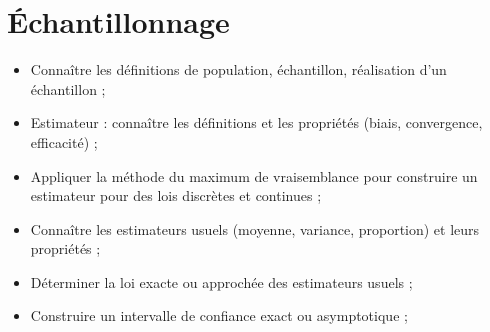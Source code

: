 \section{Échantillonnage}
\begin{itemize}
	\item
	Connaître les définitions de population, échantillon, réalisation d'un échantillon ;
	\item Estimateur : connaître les définitions et les propriétés (biais, convergence, efficacité) ;
	\item
	Appliquer la méthode du maximum de vraisemblance pour construire un estimateur pour des lois discrètes et continues ;
	\item
	Connaître les estimateurs usuels (moyenne, variance, proportion) et leurs propriétés ;
	\item
	Déterminer la loi exacte ou approchée des estimateurs usuels ;
	\item
	Construire un intervalle de confiance exact ou asymptotique  ;
\end{itemize}